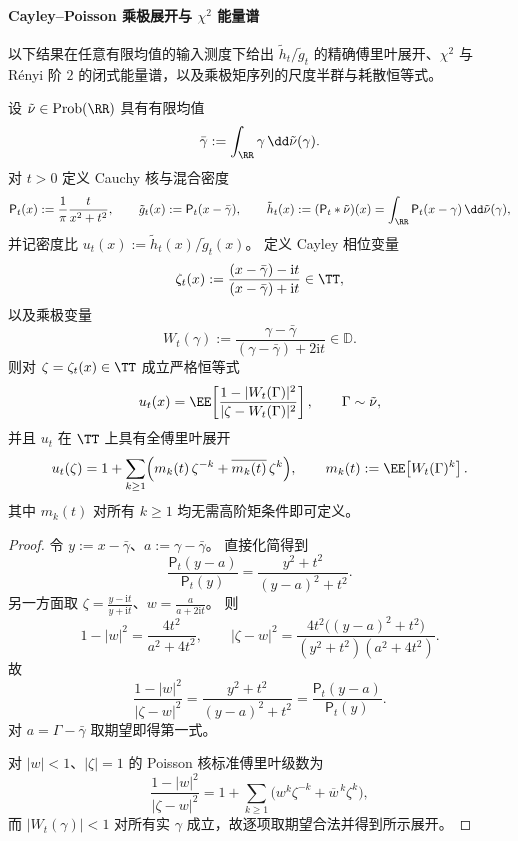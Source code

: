 \paragraph{Cayley--Poisson 乘极展开与 \texorpdfstring{$\chi^2$}{chi2} 能量谱}
以下结果在任意有限均值的输入测度下给出 \(\tilde h_t/\tilde g_t\) 的精确傅里叶展开、\(\chi^2\) 与 Rényi 阶 \(2\) 的闭式能量谱，以及乘极矩序列的尺度半群与耗散恒等式。

\begin{proposition}\label{prop:xi-poisson-cauchy-cayley-multipole-fourier}
设 \(\tilde\nu\in\mathrm{Prob}(\RR)\) 具有有限均值
\[
\bar\gamma:=\int_{\RR}\gamma\,\dd\tilde\nu(\gamma).
\]
对 \(t>0\) 定义 Cauchy 核与混合密度
\[
\mathsf P_t(x):=\frac{1}{\pi}\frac{t}{x^2+t^2},
\qquad
\tilde g_t(x):=\mathsf P_t(x-\bar\gamma),
\qquad
\tilde h_t(x):=(\mathsf P_t*\tilde\nu)(x)=\int_{\RR}\mathsf P_t(x-\gamma)\,\dd\tilde\nu(\gamma),
\]
并记密度比 \(u_t(x):=\tilde h_t(x)/\tilde g_t(x)\)。
定义 Cayley 相位变量
\[
\zeta_t(x):=\frac{(x-\bar\gamma)-\mathrm{i}t}{(x-\bar\gamma)+\mathrm{i}t}\in\TT,
\]
以及乘极变量
\[
W_t(\gamma):=\frac{\gamma-\bar\gamma}{(\gamma-\bar\gamma)+2\mathrm{i}t}\in\mathbb D.
\]
则对 \(\zeta=\zeta_t(x)\in\TT\) 成立严格恒等式
\[
u_t(x)
=\EE\!\left[\frac{1-|W_t(\Gamma)|^2}{|\zeta-W_t(\Gamma)|^2}\right],
\qquad \Gamma\sim\tilde\nu,
\]
并且 \(u_t\) 在 \(\TT\) 上具有全傅里叶展开
\[
u_t(\zeta)=1+\sum_{k\ge1}\Bigl(m_k(t)\,\zeta^{-k}+\overline{m_k(t)}\,\zeta^{k}\Bigr),
\qquad
m_k(t):=\EE\!\left[W_t(\Gamma)^k\right].
\]
其中 \(m_k(t)\) 对所有 \(k\ge1\) 均无需高阶矩条件即可定义。
\end{proposition}
\begin{proof}
令 \(y:=x-\bar\gamma\)、\(a:=\gamma-\bar\gamma\)。
直接化简得到
\[
\frac{\mathsf P_t(y-a)}{\mathsf P_t(y)}=\frac{y^2+t^2}{(y-a)^2+t^2}.
\]
另一方面取 \(\zeta=\frac{y-\mathrm{i}t}{y+\mathrm{i}t}\)、\(w=\frac{a}{a+2\mathrm{i}t}\)。
则
\[
1-|w|^2=\frac{4t^2}{a^2+4t^2},
\qquad
|\zeta-w|^2=\frac{4t^2\bigl((y-a)^2+t^2\bigr)}{(y^2+t^2)(a^2+4t^2)}.
\]
故
\[
\frac{1-|w|^2}{|\zeta-w|^2}=\frac{y^2+t^2}{(y-a)^2+t^2}=\frac{\mathsf P_t(y-a)}{\mathsf P_t(y)}.
\]
对 \(a=\Gamma-\bar\gamma\) 取期望即得第一式。
\par
对 \(|w|<1\)、\(|\zeta|=1\) 的 Poisson 核标准傅里叶级数为
\[
\frac{1-|w|^2}{|\zeta-w|^2}
=1+\sum_{k\ge1}\bigl(w^k\zeta^{-k}+\overline{w}^{\,k}\zeta^{k}\bigr),
\]
而 \(|W_t(\gamma)|<1\) 对所有实 \(\gamma\) 成立，故逐项取期望合法并得到所示展开。
\end{proof}

